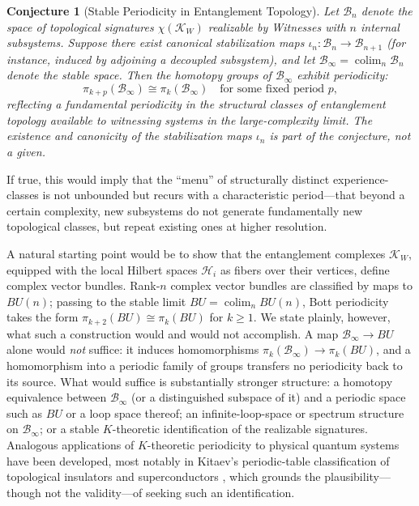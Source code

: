 \documentclass[11pt, a4paper]{article}
\newtheorem{conjecture}{Conjecture}
\begin{document}
\begin{conjecture}[Stable Periodicity in Entanglement Topology]
\label{conj:bott}
Let $\mathcal{B}_n$ denote the space of topological signatures $\chi(\mathcal{K}_W)$ realizable by Witnesses with $n$ internal subsystems. Suppose there exist canonical stabilization maps $\iota_n : \mathcal{B}_n \to \mathcal{B}_{n+1}$ (for instance, induced by adjoining a decoupled subsystem), and let $\mathcal{B}_\infty = \operatorname{colim}_n \mathcal{B}_n$ denote the stable space. Then the homotopy groups of $\mathcal{B}_\infty$ exhibit periodicity:
\begin{equation}
\pi_{k+p}(\mathcal{B}_\infty) \cong \pi_k(\mathcal{B}_\infty) \quad \text{for some fixed period } p,
\label{eq:bottconj}
\end{equation}
reflecting a fundamental periodicity in the structural classes of entanglement topology available to witnessing systems in the large-complexity limit. The existence and canonicity of the stabilization maps $\iota_n$ is part of the conjecture, not a given.
\end{conjecture}

If true, this would imply that the ``menu'' of structurally distinct experience-classes is not unbounded but recurs with a characteristic period---that beyond a certain complexity, new subsystems do not generate fundamentally new topological classes, but repeat existing ones at higher resolution.

A natural starting point would be to show that the entanglement complexes $\mathcal{K}_W$, equipped with the local Hilbert spaces $\mathcal{H}_i$ as fibers over their vertices, define complex vector bundles. Rank-$n$ complex vector bundles are classified by maps to $BU(n)$; passing to the stable limit $BU = \operatorname{colim}_n BU(n)$, Bott periodicity takes the form $\pi_{k+2}(BU) \cong \pi_k(BU)$ for $k \geq 1$. We state plainly, however, what such a construction would and would not accomplish. A map $\mathcal{B}_\infty \to BU$ alone would \emph{not} suffice: it induces homomorphisms $\pi_k(\mathcal{B}_\infty) \to \pi_k(BU)$, and a homomorphism into a periodic family of groups transfers no periodicity back to its source. What would suffice is substantially stronger structure: a homotopy equivalence between $\mathcal{B}_\infty$ (or a distinguished subspace of it) and a periodic space such as $BU$ or a loop space thereof; an infinite-loop-space or spectrum structure on $\mathcal{B}_\infty$; or a stable $K$-theoretic identification of the realizable signatures. Analogous applications of $K$-theoretic periodicity to physical quantum systems have been developed, most notably in Kitaev's periodic-table classification of topological insulators and superconductors \cite{Kitaev2009}, which grounds the plausibility---though not the validity---of seeking such an identification.
\end{document}

